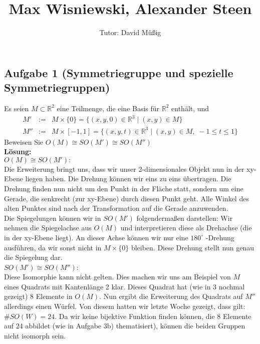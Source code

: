 \documentclass[11pt,a4paper,ngerman]{article}
\author{Tutor: David Müßig}
\date{}
\title{Max Wisniewski, Alexander Steen}
\newcommand{\R}{\mathbb{R}}
\begin{document}

\maketitle
\thispagestyle{fancy}


\subsection*{Aufgabe 1 \mdseries (Symmetriegruppe und spezielle Symmetriegruppen)}

Es seien $M \subset \mathbb{R}^2$ eine Teilmenge, die eine Basis für $\mathbb{R}^2$ enthält, und
$$
\begin{array}{rcl}
M' & := & M \times \{ 0 \} = \{ (x,y,0) \in \R^3 \; | \; (x,y) \in M \}\\
M'' & := & M \times [-1 , 1] = \{ (x,y,t) \in \R^3 \; | \; (x,y) \in M, \; -1 \leq t \leq 1 \}
\end{array}
$$
Beweisen Sie $O(M) \cong SO(M') \cong SO(M'')$\\

\textbf{Lösung:}\\

$O(M) \cong SO(M'):$\\
Die Erweiterung bringt uns, dass wir unser 2-dimensionales Objekt nun in der xy-Ebene liegen haben. Die Drehung können wir eins zu eins übertragen. Die Drehung finden nun nicht um den Punkt in der Fläche statt, sondern um eine Gerade, die senkrecht (zur xy-Ebene) durch diesen Punkt geht. Alle Winkel des alten Punktes sind nach der Transformation auf die Gerade anzuwenden.\\

Die Spiegelungen können wir in $SO(M')$ folgendermaßen darstellen: Wir nehmen die Spiegelachse aus $O(M)$ und interpretieren diese als Drehachse (die in der xy-Ebene liegt). An dieser Achse können wir nur eine $180^\circ$ -Drehung ausführen, da wir sonst nicht in $M\times\{ 0 \}$ bleiben. Diese Drehung stellt nun genau die Spiegelung dar.\\

$SO(M') \cong SO(M'')$:\\
Diese Isomorphie kann nicht gelten. Dies machen wir uns am Beispiel von $M$ eines Quadrats mit Kantenlänge 2 klar. Dieses Quadrat hat (wie in 3 nochmal gezeigt) 8 Elemente in $O(M)$. Nun ergibt die Erweiterung des Quadrats auf $M''$ allerdings einen Würfel. Von diesem hatten wir letzte Woche gezeigt, dass gilt: $\# SO ( W) = 24$. Da wir keine bijektive Funktion finden können, die 8 Elemente auf 24 abbildet (wie in Aufgabe 3b) thematisiert), können die beiden Gruppen nicht isomorph sein.
\end{document}
